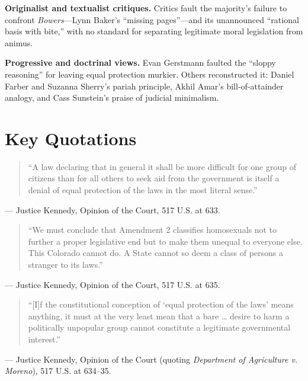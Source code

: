 \documentclass[12pt]{article}
\begin{document}
\textbf{Originalist and textualist critiques.} Critics fault the majority's failure to confront \textit{Bowers}---Lynn Baker's ``missing pages''---and its unannounced ``rational basis with bite,'' with no standard for separating legitimate moral legislation from animus.

\textbf{Progressive and doctrinal views.} Evan Gerstmann faulted the ``sloppy reasoning'' for leaving equal protection murkier. Others reconstructed it: Daniel Farber and Suzanna Sherry's pariah principle, Akhil Amar's bill-of-attainder analogy, and Cass Sunstein's praise of judicial minimalism.

\section{Key Quotations}

\begin{quote}
``A law declaring that in general it shall be more difficult for one group of citizens than for all others to seek aid from the government is itself a denial of equal protection of the laws in the most literal sense.''
\end{quote}
\noindent --- Justice Kennedy, Opinion of the Court, 517 U.S. at 633.

\begin{quote}
``We must conclude that Amendment 2 classifies homosexuals not to further a proper legislative end but to make them unequal to everyone else. This Colorado cannot do. A State cannot so deem a class of persons a stranger to its laws.''
\end{quote}
\noindent --- Justice Kennedy, Opinion of the Court, 517 U.S. at 635.

\begin{quote}
``[I]f the constitutional conception of `equal protection of the laws' means anything, it must at the very least mean that a bare \dots{} desire to harm a politically unpopular group cannot constitute a legitimate governmental interest.''
\end{quote}
\noindent --- Justice Kennedy, Opinion of the Court (quoting \textit{Department of Agriculture v. Moreno}), 517 U.S. at 634--35.
\end{document}
